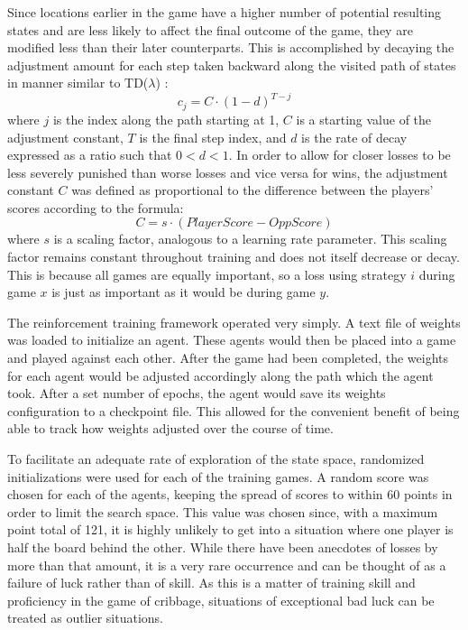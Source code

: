 Since locations earlier in the game have a higher number of potential resulting
states and are less likely to affect the final outcome of the game,
they are modified less than their later counterparts.
%
This is accomplished by decaying the adjustment amount for each step taken
backward along the visited path of states in manner similar to TD($\lambda$)
\cite{tdgammon}:
\[
	c_j = C \cdot (1 - d)^{T-j}
\]
where $j$ is the index along the path starting at 1,
$C$ is a starting value of the adjustment constant,
$T$ is the final step index,
and $d$ is the rate of decay expressed as a ratio such that $0 < d < 1$.
%
In order to allow for closer losses to be less severely punished than worse
losses and vice versa for wins,
the adjustment constant $C$ was defined as proportional to the difference
between the players' scores according to the formula:
\[
	C = s \cdot \left({PlayerScore} - {OppScore}\right) 
\]
where $s$ is a scaling factor,
analogous to a learning rate parameter.
%
This scaling factor remains constant throughout training
and does not itself decrease or decay.
%
This is because all games are equally important,
so a loss using strategy $i$ during game $x$ is just as important as
it would be during game $y$.

The reinforcement training framework operated very simply.
%
A text file of weights was loaded to initialize an agent.
%
These agents would then be placed into a game and played against each other.
%
After the game had been completed, the weights for each agent would be adjusted
accordingly along the path which the agent took.
%
After a set number of epochs, the agent would save its weights configuration to a
checkpoint file.
%
This allowed for the convenient benefit of being able to track how weights
adjusted over the course of time.

To facilitate an adequate rate of exploration of the state space,
randomized initializations were used for each of the training games.
%
A random score was chosen for each of the agents,
keeping the spread of scores to within 60 points
in order to limit the search space.
%
This value was chosen since,
with a maximum point total of 121,
it is highly unlikely to get into a situation where one player is half the board
behind the other.
%
While there have been anecdotes of losses by more than that amount,
it is a very rare occurrence and can be thought of as a failure of luck
rather than of skill.
%
As this is a matter of training skill and proficiency in the game of cribbage,
situations of exceptional bad luck can be treated as outlier situations.

